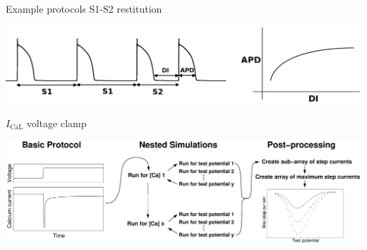 \documentclass[t,xcolor={usenames,dvipsnames}]{beamer}
\begin{document}
\begin{frame}{Example protocols}
S1-S2 restitution
\begin{center}
\includegraphics[width=\textwidth]{S1S2}
\end{center}
$I_{\mathrm{CaL}}$ voltage clamp
\begin{center}
\includegraphics[width=\textwidth]{ICaLIntro}
\end{center}
\end{frame}
\end{document}
